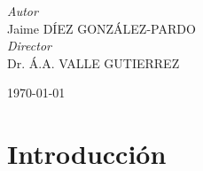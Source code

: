 \documentclass[a4paper, 11pt, oneside]{book}
\begin{document}
\begin{titlepage}
			
				\begin{flushright}
					\large
					\textit{Autor}\\
					Jaime \textsc{DÍEZ GONZÁLEZ-PARDO} \\ %
					\large
					\textit{Director}\\
					Dr. Á.A. \textsc{VALLE GUTIERREZ} %
				\end{flushright}
			
			
				\vfill\vfill\vfill %
				
				{\large\today} %
				
			
				\vfill %
		
		\end{titlepage}


		\renewcommand{\abstractname}{Abstract}



		\tableofcontents

		\listoffigures


			\chapter{Introducción} %
				\label{sec:Intro}
\end{document}
